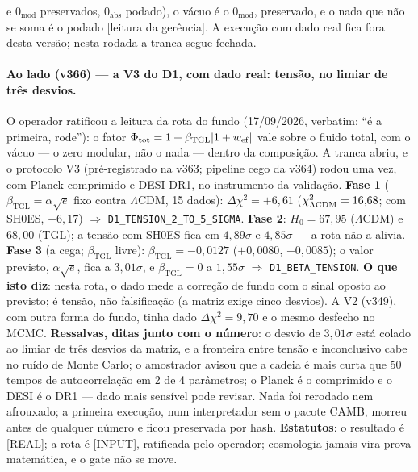 \documentclass[11pt]{article}
\newcommand{\bTGL}{\beta_{\mathrm{TGL}}}\newcommand{\Msun}{M_{\odot}}\newcommand{\TGL}{\mathrm{TGL}}
\theoremstyle{definition}\newtheorem{deriv}{Derivação}
\begin{document}
e $0_{\mathrm{mod}}$ preservados, $0_{\mathrm{abs}}$ podado), o vácuo é o $0_{\mathrm{mod}}$, preservado, e o nada que não se soma é o podado [leitura da gerência]. A execução com dado real fica fora desta versão; nesta rodada a tranca segue fechada.

\paragraph*{Ao lado (v366) --- a V3 do D1, com dado real: tensão, no limiar de três desvios.} O operador ratificou a leitura da rota do fundo (17/09/2026, verbatim: ``é a primeira, rode''): o fator $\Phi_{\rm tot}=1+\bTGL|1+w_{\rm ef}|$ vale sobre o fluido total, com o vácuo --- o zero modular, não o nada --- dentro da composição. A tranca abriu, e o protocolo V3 (pré-registrado na v363; pipeline cego da v364) rodou uma vez, com Planck comprimido e DESI DR1, no instrumento da validação. \textbf{Fase 1} ($\bTGL=\alpha\sqrt e$ fixo contra $\Lambda$CDM, 15 dados): $\Delta\chi^2=+6{,}61$ ($\chi^2_{\Lambda{\rm CDM}}=16{,}68$; com SH0ES, $+6{,}17$) $\Rightarrow$ \texttt{D1\_TENSION\_2\_TO\_5\_SIGMA}. \textbf{Fase 2}: $H_0=67{,}95$ ($\Lambda$CDM) e $68{,}00$ (TGL); a tensão com SH0ES fica em $4{,}89\sigma$ e $4{,}85\sigma$ --- a rota não a alivia. \textbf{Fase 3} (a cega; $\bTGL$ livre): $\bTGL=-0{,}0127$ ($+0{,}0080$, $-0{,}0085$); o valor previsto, $\alpha\sqrt e$, fica a $3{,}01\sigma$, e $\bTGL=0$ a $1{,}55\sigma$ $\Rightarrow$ \texttt{D1\_BETA\_TENSION}. \textbf{O que isto diz}: nesta rota, o dado mede a correção de fundo com o sinal oposto ao previsto; é tensão, não falsificação (a matriz exige cinco desvios). A V2 (v349), com outra forma do fundo, tinha dado $\Delta\chi^2=9{,}70$ e o mesmo desfecho no MCMC. \textbf{Ressalvas, ditas junto com o número}: o desvio de $3{,}01\sigma$ está colado ao limiar de três desvios da matriz, e a fronteira entre tensão e inconclusivo cabe no ruído de Monte Carlo; o amostrador avisou que a cadeia é mais curta que 50 tempos de autocorrelação em 2 de 4 parâmetros; o Planck é o comprimido e o DESI é o DR1 --- dado mais sensível pode revisar. Nada foi rerodado nem afrouxado; a primeira execução, num interpretador sem o pacote CAMB, morreu antes de qualquer número e ficou preservada por hash. \textbf{Estatutos}: o resultado é [REAL]; a rota é [INPUT], ratificada pelo operador; cosmologia jamais vira prova matemática, e o gate não se move.
\end{document}
